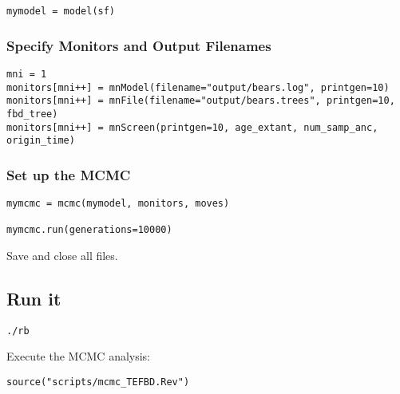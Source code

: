 {\tt \begin{snugshade*}
\begin{lstlisting}
mymodel = model(sf)
\end{lstlisting}
\end{snugshade*}}

\medskip
\subsubsection{Specify Monitors and Output Filenames}\label{subsub:RB-Monitors}


{\tt \begin{snugshade*}
\begin{lstlisting}
mni = 1
monitors[mni++] = mnModel(filename="output/bears.log", printgen=10)
monitors[mni++] = mnFile(filename="output/bears.trees", printgen=10, fbd_tree)
monitors[mni++] = mnScreen(printgen=10, age_extant, num_samp_anc, origin_time)
\end{lstlisting}
\end{snugshade*}}

\medskip
\subsubsection{Set up the MCMC}


{\tt \begin{snugshade*}
\begin{lstlisting}
mymcmc = mcmc(mymodel, monitors, moves)

mymcmc.run(generations=10000)
\end{lstlisting}
\end{snugshade*}}

{\begin{framed}
Save and close all files.
\end{framed}}

\bigskip
\subsection{Run it}\label{subsect:RB-RunMCMC}


{\tt \begin{snugshade*}
\begin{lstlisting}
./rb
\end{lstlisting}
\end{snugshade*}}

Execute the MCMC analysis:
{\tt \begin{snugshade*}
\begin{lstlisting}
source("scripts/mcmc_TEFBD.Rev")
\end{lstlisting}
\end{snugshade*}}

